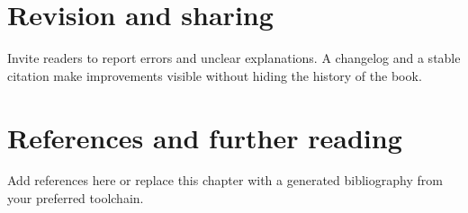 \documentclass[11pt,oneside]{book}
\begin{document}
\chapter{Revision and sharing}
Invite readers to report errors and unclear explanations. A changelog and a stable citation make improvements visible without hiding the history of the book.
\backmatter
\chapter*{References and further reading}
Add references here or replace this chapter with a generated bibliography from your preferred toolchain.
\end{document}
